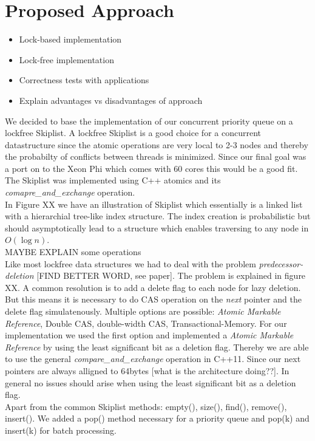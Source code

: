 \section{Proposed Approach}\label{sec:approach}

\begin{itemize}
	\item Lock-based implementation
	\item Lock-free implementation
	\item Correctness tests with applications
	\item Explain advantages vs disadvantages of approach
\end{itemize}

We decided to base the implementation of our concurrent priority queue on a lockfree Skiplist. A lockfree Skiplist is a good choice for a concurrent datastructure since the atomic operations are very local to 2-3 nodes and thereby the probabilty of conflicts between threads is minimized. Since our final goal was a port on to the Xeon Phi which comes with 60 cores this would be a good fit.\\
The Skiplist was implemented using C++ atomics and its {\em comapre\_and\_exchange} operation.\\
In Figure XX we have an illustration of Skiplist which essentially is a linked list with a hierarchial tree-like index structure. The index creation is probabilistic but should asymptotically lead to a structure which enables traversing to any node in $O(\log n)$.\\
MAYBE EXPLAIN some operations\\
Like most lockfree data structures we had to deal with the problem {\em predecessor-deletion} [FIND BETTER WORD, see paper]. The problem is explained in figure XX.
A common resolution is to add a delete flag to each node for lazy deletion. But this means it is necessary to do CAS operation on the {\em next} pointer and the delete flag simulatenously. Multiple options are possible: {\em Atomic Markable Reference}, Double CAS, double-width CAS, Transactional-Memory. For our implementation we used the first option and implemented a {\em Atomic Markable Reference} by using the least significant bit as a deletion flag. Thereby we are able to use the general {\em compare\_and\_exchange} operation in C++11. Since our next pointers are always alligned to 64bytes [what is the architecture doing??]. In general no issues should arise when using the least significant bit as a deletion flag.\\
Apart from the common Skiplist methods: empty(), size(), find(), remove(), insert(). We added a pop() method necessary for a priority queue and pop(k) and insert(k) for batch processing.\\


